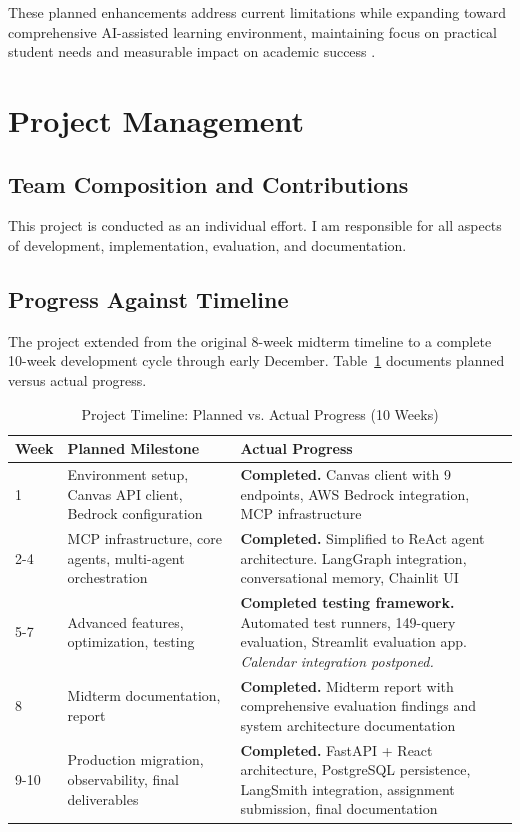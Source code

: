 \documentclass{article}
\begin{document}
These planned enhancements address current limitations while expanding toward comprehensive AI-assisted learning environment, maintaining focus on practical student needs and measurable impact on academic success \cite{genai2024higher, lms2025ai}.

\section{Project Management}

\subsection{Team Composition and Contributions}

This project is conducted as an individual effort. I am responsible for all aspects of development, implementation, evaluation, and documentation.

\subsection{Progress Against Timeline}

The project extended from the original 8-week midterm timeline to a complete 10-week development cycle through early December. Table~\ref{tab:timeline} documents planned versus actual progress.

\begin{table}[h]
\centering
\caption{Project Timeline: Planned vs. Actual Progress (10 Weeks)}
\label{tab:timeline}
\begin{tabular}{lp{5cm}p{5.5cm}}
\toprule
\textbf{Week} & \textbf{Planned Milestone} & \textbf{Actual Progress} \\
\midrule
1 & Environment setup, Canvas API client, Bedrock configuration & \textbf{Completed.} Canvas client with 9 endpoints, AWS Bedrock integration, MCP infrastructure \\
\midrule
2-4 & MCP infrastructure, core agents, multi-agent orchestration & \textbf{Completed.} Simplified to ReAct agent architecture. LangGraph integration, conversational memory, Chainlit UI \\
\midrule
5-7 & Advanced features, optimization, testing & \textbf{Completed testing framework.} Automated test runners, 149-query evaluation, Streamlit evaluation app. \textit{Calendar integration postponed.} \\
\midrule
8 & Midterm documentation, report & \textbf{Completed.} Midterm report with comprehensive evaluation findings and system architecture documentation \\
\midrule
9-10 & Production migration, observability, final deliverables & \textbf{Completed.} FastAPI + React architecture, PostgreSQL persistence, LangSmith integration, assignment submission, final documentation \\
\bottomrule
\end{tabular}
\end{table}
\end{document}
